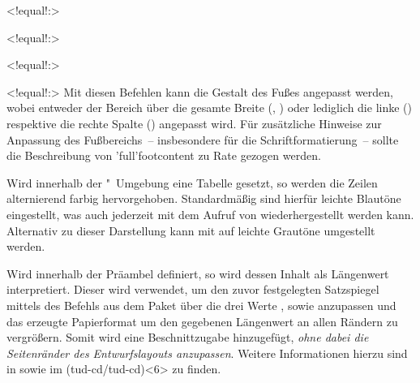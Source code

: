 \begin{DeclareEntity}{}
\begin{NoIndexDefault}
\begin{Declaration}
  {}
  <!equal!:>
\begin{Declaration}
  {}
  <!equal!:>
\begin{Declaration}
  {}
  <!equal!:>
\begin{Declaration}
  {}
  <!equal!:>
\printdeclarationlist
%
Mit diesen Befehlen kann die Gestalt des Fußes angepasst werden, wobei entweder 
der Bereich über die gesamte Breite (, ) 
oder lediglich die linke () respektive die rechte Spalte 
() angepasst wird. Für zusätzliche Hinweise zur Anpassung 
des Fußbereichs~-- insbesondere für die Schriftformatierung~-- sollte die 
Beschreibung von \Macro'full'{footcontent} zu Rate gezogen werden.
\end{Declaration}
\end{Declaration}
\end{Declaration}
\end{Declaration}

\begin{Declaration}
  {}
\begin{Declaration}
  {}
\begin{Declaration}
  {}
\printdeclarationlist
%
Wird innerhalb der "~Umgebung eine Tabelle gesetzt, 
so werden die Zeilen alternierend farbig hervorgehoben. Standardmäßig sind 
hierfür leichte Blautöne eingestellt, was auch jederzeit mit dem Aufruf von 
 wiederhergestellt werden kann. Alternativ zu dieser 
Darstellung kann mit  auf leichte Grautöne umgestellt werden.
\end{Declaration}
\end{Declaration}
\end{Declaration}

\begin{Declaration}
  {}
\printdeclarationlist
%
Wird  innerhalb der Präambel definiert, so wird dessen 
Inhalt als Längenwert interpretiert. Dieser wird verwendet, um den zuvor 
festgelegten Satzspiegel mittels des Befehls  aus dem Paket 
 über die drei Werte ,  sowie 
 anzupassen und das erzeugte Papierformat um den gegebenen 
Längenwert an allen Rändern zu vergrößern. Somit wird eine Beschnittzugabe 
hinzugefügt, \emph{ohne dabei die Seitenränder des Entwurfslayouts anzupassen}. 
Weitere Informationen hierzu sind in  sowie im 
\GitHubRepo(tud-cd/tud-cd)<6> zu finden.
\end{Declaration}
%
\end{NoIndexDefault}
\end{DeclareEntity}




